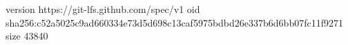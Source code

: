 version https://git-lfs.github.com/spec/v1
oid sha256:c52a5025c9ad660334e73d5d698c13caf5975bdbd26e337b6d6bb07fc11f9271
size 43840
